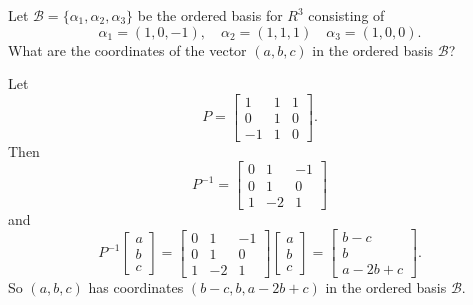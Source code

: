  Let $\mathcal{B} = \{\alpha_1, \alpha_2, \alpha_3\}$ be the
ordered basis for $R^3$ consisting of
\begin{equation*}
  \alpha_1 = (1, 0, -1), \quad
  \alpha_2 = (1, 1, 1) \quad
  \alpha_3 = (1, 0, 0).
\end{equation*}
What are the coordinates of the vector $(a, b, c)$ in the ordered
basis $\mathcal{B}$?
\begin{solution}
  Let
  \begin{equation*}
    P =
    \begin{bmatrix}
      1 & 1 & 1 \\
      0 & 1 & 0 \\
      -1 & 1 & 0
    \end{bmatrix}.
  \end{equation*}
  Then
  \begin{equation*}
    P^{-1} =
    \begin{bmatrix}
      0 & 1 & -1 \\
      0 & 1 & 0 \\
      1 & -2 & 1
    \end{bmatrix}
  \end{equation*}
  and
  \begin{equation*}
    P^{-1}
    \begin{bmatrix}
      a \\ b \\ c
    \end{bmatrix}
    =
    \begin{bmatrix}
      0 & 1 & -1 \\
      0 & 1 & 0 \\
      1 & -2 & 1
    \end{bmatrix}
    \begin{bmatrix}
      a \\ b \\ c
    \end{bmatrix}
    =
    \begin{bmatrix}
      b - c \\ b \\ a - 2b + c
    \end{bmatrix}.
  \end{equation*}
  So $(a,b,c)$ has coordinates $(b - c, b, a - 2b + c)$ in the ordered
  basis $\mathcal{B}$.
\end{solution}

